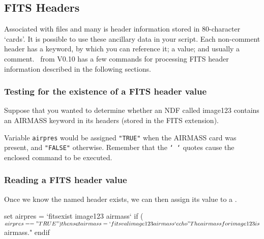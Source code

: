 \documentclass[twoside,11pt,nolof]{starlink}
\providecommand{\KAPPAref}{\xref{{\footnotesize KAPPA}}{sun95}{}}
\providecommand{\NDFrefa}[1]{\xref{#1}{sun33}{}}
\begin{document}
\newpage
\subsection{FITS Headers\label{sc4_se_FITS_headers}}

Associated with  files and many
\NDFrefa{\textsf{NDF}s} is header information stored in 80-character
`cards'.  It is possible to use these ancillary data in your script.
Each non-comment header has a keyword, by which you can reference it;
a value; and usually a comment.  \KAPPAref\ from V0.10 has a few
commands for processing \textsf{FITS} header information described in the
following sections.

\subsubsection{Testing for the existence of a FITS header value}

Suppose that you wanted to determine whether an NDF called image123
contains an AIRMASS keyword in its 
headers (stored in the FITS extension).

\begin{small}
\end{small}
Variable \texttt{airpres} would be assigned \texttt{"TRUE"} when the AIRMASS
card was present, and \texttt{"FALSE"} otherwise.  Remember that the
\texttt{`~`} quotes cause the enclosed command to be executed.

\subsubsection{Reading a FITS header value}

Once we know the named header exists, we can then assign its value
to a .

\begin{small}
\begin{terminalv}
     set airpres = `fitsexist image123 airmass`
     if ( $airpres == "TRUE" ) then
        set airmass = `fitsval image123 airmass`
        echo "The airmass for image123 is $airmass."
     endif
\end{terminalv}
\end{small}
\end{document}
